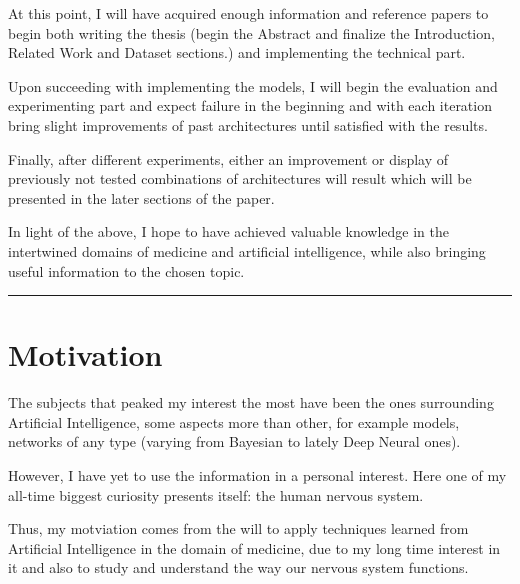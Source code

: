 \documentclass[a4paper]{article} %
\begin{document}
At this point, I will have acquired enough information and reference papers to begin both writing the thesis (begin the
Abstract and finalize the Introduction, Related Work and Dataset sections.) and implementing the technical part.

Upon succeeding with implementing the models, I will begin the evaluation and experimenting part and expect failure in
the beginning and with each iteration bring slight improvements of past architectures until satisfied with the results.

Finally, after different experiments, either an improvement or display of previously not tested combinations of
architectures will result which will be presented in the later sections of the paper.

In light of the above, I hope to have achieved valuable knowledge in the intertwined domains of medicine and artificial intelligence,
while also bringing useful information to the chosen topic.

\vspace{14pt}
\hrule
\section{Motivation}
The subjects that peaked my interest the most have been the ones surrounding Artificial Intelligence,
some aspects more than other, for example models, networks of any type (varying from Bayesian to lately Deep Neural ones).

However, I have yet to use the information in a personal interest.
Here one of my all-time biggest curiosity presents itself: the human nervous system.

Thus, my motviation comes from the will to apply techniques learned from Artificial Intelligence in the domain of medicine,
due to my long time interest in it and also to study and understand the way our nervous system functions.
\end{document}
